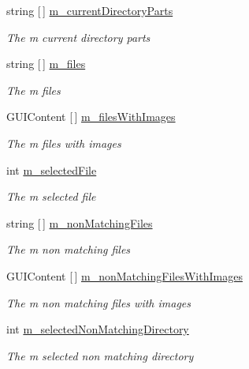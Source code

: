 \begin{DoxyCompactItemize}
string \mbox{[}$\,$\mbox{]} \hyperlink{class_lerp2_a_p_i_1_1_utility_1_1_file_browser_affcb6db4211647ffdfed940af8187ca5}{m\+\_\+current\+Directory\+Parts}
\begin{DoxyCompactList}\small\item\em The m current directory parts \end{DoxyCompactList}\item 
string \mbox{[}$\,$\mbox{]} \hyperlink{class_lerp2_a_p_i_1_1_utility_1_1_file_browser_a98599b289c01a63f9d0a4813365c7535}{m\+\_\+files}
\begin{DoxyCompactList}\small\item\em The m files \end{DoxyCompactList}\item 
G\+U\+I\+Content \mbox{[}$\,$\mbox{]} \hyperlink{class_lerp2_a_p_i_1_1_utility_1_1_file_browser_a0349d538df70141cc98344e9d01cf10c}{m\+\_\+files\+With\+Images}
\begin{DoxyCompactList}\small\item\em The m files with images \end{DoxyCompactList}\item 
int \hyperlink{class_lerp2_a_p_i_1_1_utility_1_1_file_browser_a74d363abf962c73930b5ab94ec1421fd}{m\+\_\+selected\+File}
\begin{DoxyCompactList}\small\item\em The m selected file \end{DoxyCompactList}\item 
string \mbox{[}$\,$\mbox{]} \hyperlink{class_lerp2_a_p_i_1_1_utility_1_1_file_browser_a9cea3280da4b56e7f241ffa23a53821b}{m\+\_\+non\+Matching\+Files}
\begin{DoxyCompactList}\small\item\em The m non matching files \end{DoxyCompactList}\item 
G\+U\+I\+Content \mbox{[}$\,$\mbox{]} \hyperlink{class_lerp2_a_p_i_1_1_utility_1_1_file_browser_aaa4526f36e04fe682fd2fcffb5c62d6d}{m\+\_\+non\+Matching\+Files\+With\+Images}
\begin{DoxyCompactList}\small\item\em The m non matching files with images \end{DoxyCompactList}\item 
int \hyperlink{class_lerp2_a_p_i_1_1_utility_1_1_file_browser_ab814a833d349879bc896ae823db7e2e9}{m\+\_\+selected\+Non\+Matching\+Directory}
\begin{DoxyCompactList}\small\item\em The m selected non matching directory \end{DoxyCompactList}\item 

\end{DoxyCompactItemize}
